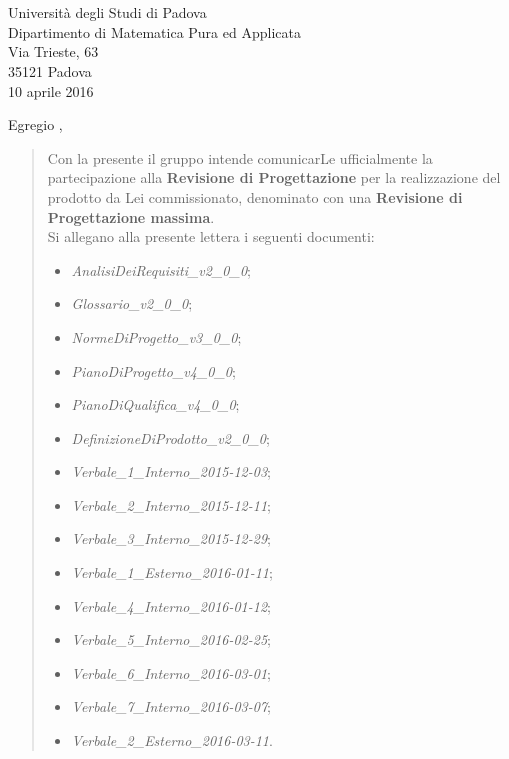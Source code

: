 \begin{letter}{\hfill \TV \\
	\hfill \RC \\
	\hfill Università degli Studi di Padova \\
	\hfill Dipartimento di Matematica Pura ed Applicata \\
	\hfill Via Trieste, 63 \\
	\hfill 35121 Padova \\
	\hfill 10 aprile 2016}

\date{}
\opening{Egregio \TV,}

	\begin{quotation}
		Con la presente il gruppo \textit{\gruppo} intende comunicarLe ufficialmente la partecipazione alla \textbf{Revisione di Progettazione} per la realizzazione del prodotto da Lei commissionato, denominato \textbf{\progetto} con una \textbf{Revisione di Progettazione massima}.
		\\
		Si allegano alla presente lettera i seguenti documenti:
		\begin{itemize}
			\item \textit{AnalisiDeiRequisiti\_v2\_0\_0};
			\item \textit{Glossario\_v2\_0\_0};
			\item \textit{NormeDiProgetto\_v3\_0\_0};
			\item \textit{PianoDiProgetto\_v4\_0\_0};
			\item \textit{PianoDiQualifica\_v4\_0\_0};
			\item \textit{DefinizioneDiProdotto\_v2\_0\_0};
			\item \textit{Verbale\_1\_Interno\_2015-12-03};
			\item \textit{Verbale\_2\_Interno\_2015-12-11};
			\item \textit{Verbale\_3\_Interno\_2015-12-29};
			\item \textit{Verbale\_1\_Esterno\_2016-01-11};
			\item \textit{Verbale\_4\_Interno\_2016-01-12};
			\item \textit{Verbale\_5\_Interno\_2016-02-25};
			\item \textit{Verbale\_6\_Interno\_2016-03-01};
			\item \textit{Verbale\_7\_Interno\_2016-03-07};
			\item \textit{Verbale\_2\_Esterno\_2016-03-11}.

\end{itemize}
\end{quotation}
\end{letter}
